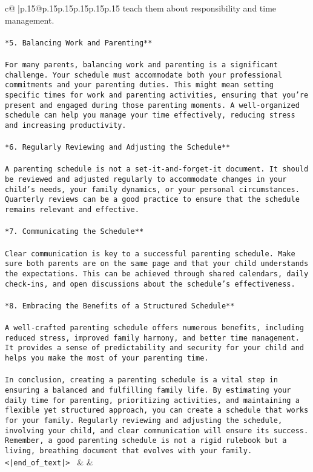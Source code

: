 \documentclass{article}
\begin{document}
{\begin{supertabular}{c@{$\;$}|p{.15\linewidth}@{}p{.15\linewidth}p{.15\linewidth}p{.15\linewidth}p{.15\linewidth}p{.15\linewidth}}
{{{teach them about responsibility and time management.\\ \tt \\ \tt **5. Balancing Work and Parenting**\\ \tt \\ \tt For many parents, balancing work and parenting is a significant challenge. Your schedule must accommodate both your professional commitments and your parenting duties. This might mean setting specific times for work and parenting activities, ensuring that you're present and engaged during those parenting moments. A well-organized schedule can help you manage your time effectively, reducing stress and increasing productivity.\\ \tt \\ \tt **6. Regularly Reviewing and Adjusting the Schedule**\\ \tt \\ \tt A parenting schedule is not a set-it-and-forget-it document. It should be reviewed and adjusted regularly to accommodate changes in your child's needs, your family dynamics, or your personal circumstances. Quarterly reviews can be a good practice to ensure that the schedule remains relevant and effective.\\ \tt \\ \tt **7. Communicating the Schedule**\\ \tt \\ \tt Clear communication is key to a successful parenting schedule. Make sure both parents are on the same page and that your child understands the expectations. This can be achieved through shared calendars, daily check-ins, and open discussions about the schedule's effectiveness.\\ \tt \\ \tt **8. Embracing the Benefits of a Structured Schedule**\\ \tt \\ \tt A well-crafted parenting schedule offers numerous benefits, including reduced stress, improved family harmony, and better time management. It provides a sense of predictability and security for your child and helps you make the most of your parenting time.\\ \tt \\ \tt In conclusion, creating a parenting schedule is a vital step in ensuring a balanced and fulfilling family life. By estimating your daily time for parenting, prioritizing activities, and maintaining a flexible yet structured approach, you can create a schedule that works for your family. Regularly reviewing and adjusting the schedule, involving your child, and clear communication will ensure its success. Remember, a good parenting schedule is not a rigid rulebook but a living, breathing document that evolves with your family.<|end_of_text|> 
	  } 
	   } 
	   } 
	 & & \\ 
 


\end{supertabular}}
\end{document}
